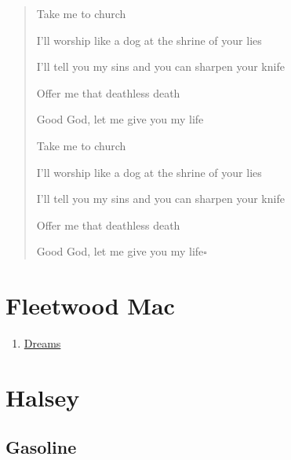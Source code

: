 \documentclass{book}
\numberwithin{equation}{section}
\begin{document}
\begin{quotation}
    Take me to church
    
    I'll worship like a dog at the shrine of your lies
    
    I'll tell you my sins and you can sharpen your knife
    
    Offer me that deathless death
    
    Good God, let me give you my life
    
    Take me to church
    
    I'll worship like a dog at the shrine of your lies
    
    I'll tell you my sins and you can sharpen your knife
    
    Offer me that deathless death
    
    Good God, let me give you my life\hfill$\square$
\end{quotation}


\chapter{Fleetwood Mac}
\begin{enumerate}
    \item \href{https://www.youtube.com/watch?v=5oWyMakvQew}{Dreams}
\end{enumerate}


\chapter{Halsey}

\section{Gasoline}
\end{document}
